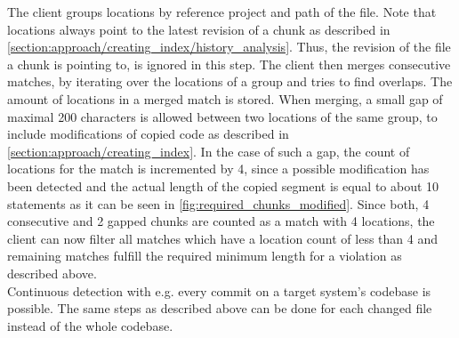 The client groups locations by reference project and path of the file.
Note that locations always point to the latest revision of a chunk as described in \autoref{section:approach/creating_index/history_analysis}.
Thus, the revision of the file a chunk is pointing to, is ignored in this step.
The client then merges consecutive matches, by iterating over the locations of a group and tries to find overlaps.
The amount of locations in a merged match is stored.
When merging, a small gap of maximal 200 characters is allowed between two locations of the same group, to include modifications of copied code as described in \autoref{section:approach/creating_index}.
In the case of such a gap, the count of locations for the match is incremented by 4, since a possible modification has been detected and the actual length of the copied segment is equal to about 10 statements as it can be seen in \autoref{fig:required_chunks_modified}.
Since both, 4 consecutive and 2 gapped chunks are counted as a match with 4 locations, the client can now filter all matches which have a location count of less than 4 and remaining matches fulfill the required minimum length for a violation as described above.
\\
Continuous detection with e.g. every commit on a target system's codebase is possible.
The same steps as described above can be done for each changed file instead of the whole codebase.